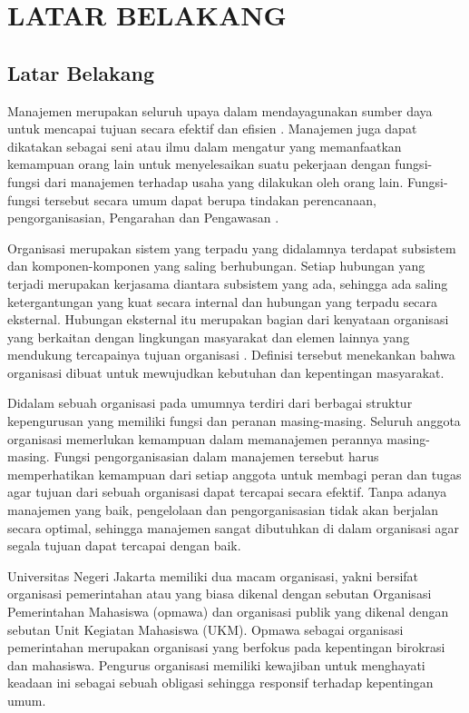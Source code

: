 
\chapter{LATAR BELAKANG}

\section{Latar Belakang}
Manajemen merupakan seluruh upaya dalam mendayagunakan sumber daya untuk mencapai tujuan secara efektif dan efisien \cite{rifai}. Manajemen juga dapat dikatakan sebagai seni atau ilmu dalam mengatur yang memanfaatkan kemampuan orang lain untuk menyelesaikan suatu pekerjaan dengan fungsi-fungsi dari manajemen terhadap usaha yang dilakukan oleh orang lain. Fungsi-fungsi tersebut secara umum dapat berupa tindakan perencanaan, pengorganisasian, Pengarahan dan Pengawasan \cite{rachman}.

Organisasi merupakan sistem yang terpadu yang didalamnya terdapat subsistem dan komponen-komponen yang saling berhubungan. Setiap hubungan yang terjadi merupakan kerjasama diantara subsistem yang ada, sehingga ada saling ketergantungan yang kuat secara internal dan hubungan yang terpadu secara eksternal. Hubungan eksternal itu merupakan bagian dari kenyataan organisasi yang berkaitan dengan lingkungan masyarakat dan elemen lainnya yang mendukung tercapainya tujuan organisasi \cite{priansa}. Definisi tersebut menekankan bahwa organisasi dibuat untuk mewujudkan kebutuhan dan kepentingan masyarakat.

Didalam sebuah organisasi pada umumnya terdiri dari berbagai struktur kepengurusan yang memiliki fungsi dan peranan masing-masing. Seluruh anggota organisasi memerlukan kemampuan dalam memanajemen perannya masing-masing. Fungsi pengorganisasian dalam manajemen tersebut harus memperhatikan kemampuan dari setiap anggota untuk membagi peran dan tugas agar tujuan dari sebuah organisasi dapat tercapai secara efektif. Tanpa adanya manajemen yang baik, pengelolaan dan pengorganisasian tidak akan berjalan secara optimal, sehingga manajemen sangat dibutuhkan di dalam organisasi agar segala tujuan dapat tercapai dengan baik.

Universitas Negeri Jakarta memiliki dua macam organisasi, yakni bersifat organisasi pemerintahan atau yang biasa dikenal dengan sebutan Organisasi Pemerintahan Mahasiswa (opmawa) dan organisasi publik yang dikenal dengan sebutan Unit Kegiatan Mahasiswa (UKM). Opmawa sebagai organisasi pemerintahan merupakan organisasi yang berfokus pada kepentingan birokrasi dan mahasiswa. Pengurus organisasi memiliki kewajiban untuk menghayati keadaan ini sebagai sebuah obligasi sehingga responsif terhadap kepentingan umum.

